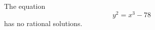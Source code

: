 \begin{proposition}
    The equation
\[
    y^2=x^3-78
\]
    has no rational solutions.
\end{proposition}
